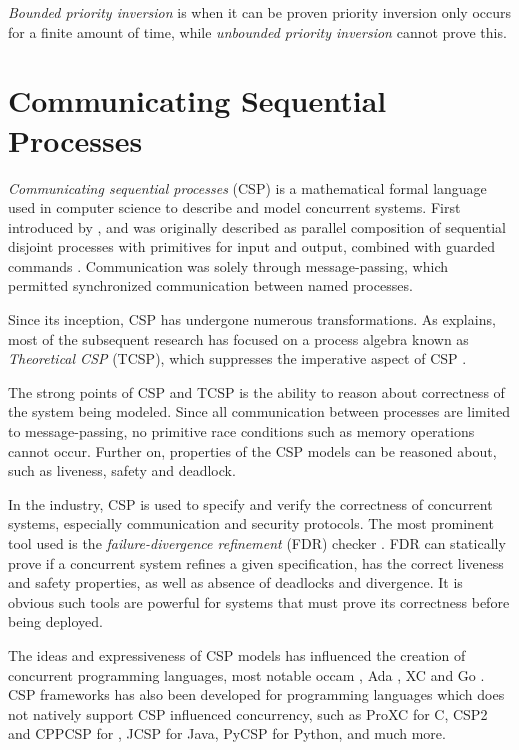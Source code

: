 \textit{Bounded priority inversion} is when it can be proven priority inversion only occurs for a finite amount of time, while \textit{unbounded priority inversion} cannot prove this. 


\section{Communicating Sequential Processes}
\label{sec:csp}


\textit{Communicating sequential processes} (CSP) is a mathematical formal language used in computer science to describe and model concurrent systems. First introduced by \citet{hoare1978communicating}, and was originally described as parallel composition of sequential disjoint processes with primitives for input and output, combined with guarded commands \citep{dijkstra1975guarded}. Communication was solely through message\hyp{}passing, which permitted synchronized communication between named processes.

Since its inception, CSP has undergone numerous transformations. As \citet{abdallah2005communicating} explains, most of the subsequent research has focused on a process algebra known as \textit{Theoretical CSP} (TCSP), which suppresses the imperative aspect of CSP \citep{brookes1984theory}. 

The strong points of CSP and TCSP is the ability to reason about correctness of the system being modeled. Since all communication between processes are limited to message\hyp{}passing, no primitive race conditions such as memory operations cannot occur. Further on, properties of the CSP models can be reasoned about, such as liveness, safety and deadlock.

In the industry, CSP is used to specify and verify the correctness of concurrent systems, especially communication and security protocols. The most prominent tool used is the \textit{failure\hyp{}divergence refinement} (FDR) checker \citep{manual2000failures}. FDR can statically prove if a concurrent system refines a given specification, has the correct liveness and safety properties, as well as absence of deadlocks and divergence. It is obvious such tools are powerful for systems that must prove its correctness before being deployed.

The ideas and expressiveness of CSP models has influenced the creation of concurrent programming languages, most notable occam \citep{inmos1988occam}, Ada \citep{ledgard1983reference}, XC \citep{douglas2009programming} and Go \citep{go2009go}. CSP frameworks has also been developed for programming languages which does not natively support CSP influenced concurrency, such as ProXC \citep{pettersen2016proxc} for C, \Cpp{}CSP2 \citep{brown2007c++csp2} and CPPCSP \citep{chalmers2016cppcsp} for \Cpp{}, JCSP \citep{welch2007jcsp} for Java, PyCSP \citep{bjorndalen2007pycsp} for Python, and much more.

